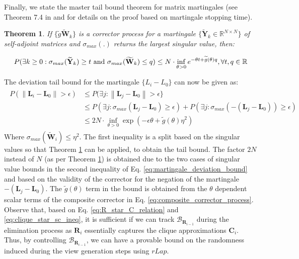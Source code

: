 \documentclass{article}
\newcommand{\norm}[1]{\left\lVert#1\right\rVert}
\def\mC{{\mathbf{C}}}
\def\mL{{\mathbf{L}}}
\def\mR{{\mathbf{R}}}
\def\mW{{\mathbf{W}}}
\def\mY{{\mathbf{Y}}}
\def\sR{{\mathbb{R}}}
\theoremstyle{plain}
\newtheorem{theorem}{Theorem}[section]
\theoremstyle{definition}
\theoremstyle{remark}
\begin{document}
Finally, we state the master tail bound theorem for matrix martingales (see Theorem 7.4 in \citet{tropp2019matrix} and \citet{freedman1975tail} for details on the proof based on martingale stopping time).
\begin{theorem}
\label{thm:matrix_martingale_master_tail_bound}
\citep{tropp2019matrix} If $\{\widetilde{g}\widetilde{\mW}_k\}$ is a corrector process for a martingale $\{\widetilde{\mY}_k \in \sR^{N \times N}\}$ of self-adjoint matrices and $\sigma_{max}(.)$ returns the largest singular value, then:

\begin{equation}
\label{eq:master_tail_bound}
P(\exists k \ge 0 : \sigma_{max}(\widetilde{\mY}_k) \ge t \text{ and } \sigma_{max}(\widetilde{\mW}_k) \le q ) \le N \cdot \inf_{\theta > 0} e^{-\theta t + \widetilde{g}(\theta)q} , \hfill \forall t, q \in \mathbb{R}
\end{equation}
\end{theorem}

The deviation tail bound for the martingale $\{L_i - L_0\}$ can now be given as:
\begin{align}
\begin{split}
\label{eq:martingale_deviation_bound}
P(\norm{\mL_i - \mL_0} > \epsilon ) &\le P( \exists j: \norm{\mL_j - \mL_0} > \epsilon \} \\
 &\le P( \exists j: \sigma_{max}(\mL_j - \mL_0) \ge \epsilon) + P( \exists j: \sigma_{max}(-(\mL_j - \mL_0)) \ge \epsilon) \\
 &\le 2N \cdot \inf_{\theta > 0} \exp( -\epsilon \theta + \widetilde{g}(\theta) \eta^2)
\end{split}
\end{align}
Where $\sigma_{max}(\widetilde{\mW}_i) \le \eta^2$. The first inequality is a split based on the singular values so that Theorem \ref{thm:matrix_martingale_master_tail_bound} can be applied, to obtain the tail bound. The factor $2N$ instead of $N$ (as per Theorem \ref{thm:matrix_martingale_master_tail_bound}) is obtained due to the two cases of singular value bounds in the second inequality of Eq. \ref{eq:martingale_deviation_bound} and based on the validity of the corrector for the negation of the martingale $-(\mL_j - \mL_0)$. The $\widetilde{g}(\theta)$ term in the bound is obtained from the $\theta$ dependent scalar terms of the composite corrector in Eq. \ref{eq:composite_corrector_process}. Observe that, based on Eq. \ref{eq:R_star_C_relation} and \ref{eq:clique_star_sc_ineq}, it is sufficient if we can track $\mathcal{B}_{\mR_{i-1}}$ during the elimination process as $\mR_{i}$ essentially captures the clique approximations $\mC_i$. Thus, by controlling $\mathcal{B}_{\mR_{i-1}}$, we can have a provable bound on the randomness induced during the view generation steps using $rLap$.  
\end{document}
